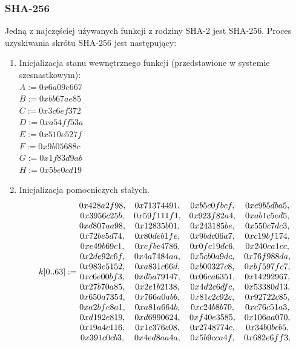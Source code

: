 \subsubsection{SHA-256}
Jedną z najczęściej używanych funkcji z rodziny SHA-2 jest SHA-256. Proces uzyskiwania skrótu SHA-256 jest następujący:
\begin{enumerate}
	\item Inicjalizacja stanu wewnętrznego funkcji (przedstawione w systemie szesnastkowym): \\
		$A := 0x6a09e667$ \\
		$B := 0xbb67ae85$ \\
		$C := 0x3c6ef372$ \\
		$D := 0xa54ff53a$ \\
		$E := 0x510e527f$ \\
		$F := 0x9b05688c$ \\
		$G := 0x1f83d9ab$ \\
		$H := 0x5be0cd19$
	\item Inicjalizacja pomocniczych stałych. \\
			$$
			k[0..63] := \\
			\begin{matrix}
				0x428a2f98, & 0x71374491, & 0xb5c0fbcf, & 0xe9b5dba5, \\
				0x3956c25b, & 0x59f111f1, & 0x923f82a4, & 0xab1c5ed5, \\
				0xd807aa98, & 0x12835b01, & 0x243185be, & 0x550c7dc3, \\
				0x72be5d74, & 0x80deb1fe, & 0x9bdc06a7, & 0xc19bf174, \\
				0xe49b69c1, & 0xefbe4786, & 0x0fc19dc6, & 0x240ca1cc, \\
				0x2de92c6f, & 0x4a7484aa, & 0x5cb0a9dc, & 0x76f988da, \\
				0x983e5152, & 0xa831c66d, & 0xb00327c8, & 0xbf597fc7, \\
				0xc6e00bf3, & 0xd5a79147, & 0x06ca6351, & 0x14292967, \\
				0x27b70a85, & 0x2e1b2138, & 0x4d2c6dfc, & 0x53380d13, \\
				0x650a7354, & 0x766a0abb, & 0x81c2c92e, & 0x92722c85, \\
				0xa2bfe8a1, & 0xa81a664b, & 0xc24b8b70, & 0xc76c51a3, \\
				0xd192e819, & 0xd6990624, & 0xf40e3585, & 0x106aa070, \\
				0x19a4c116, & 0x1e376c08, & 0x2748774c, & 0x34b0bcb5, \\
				0x391c0cb3, & 0x4ed8aa4a, & 0x5b9cca4f, & 0x682e6ff3, \\

\end{matrix}$$
\end{enumerate}
